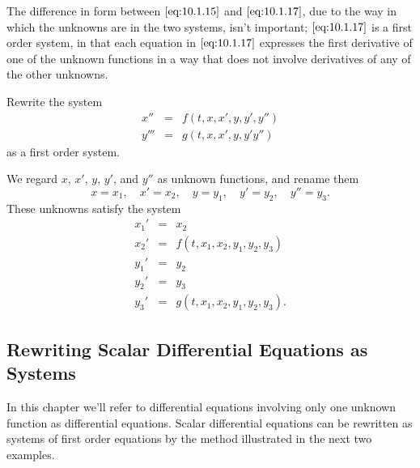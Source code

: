 \documentclass{ximera}
\begin{document}
\begin{remark} The difference in form between $\eqref{eq:10.1.15}$ and
$\eqref{eq:10.1.17}$, due to the way in which the unknowns are 
in the two systems, isn't  important;     $\eqref{eq:10.1.17}$ is a first
order system, in that each equation in $\eqref{eq:10.1.17}$ expresses the
first derivative of one of the unknown functions in a way that does
not involve derivatives of any of the other unknowns.
\end{remark}

\begin{example}\label{example:10.1.5}
 Rewrite the system
$$
\begin{array}{ccc} x''&=&f(t,x,x',y,y',y'')\\
y'''&=&g(t,x,x',y,y'y'')
\end{array}
$$
 as a first order system.


\begin{explanation}
We regard $x$, $x'$, $y$, $y'$, and $y''$ as unknown functions, and
rename them
$$
x=x_1,\quad x'=x_2,\quad y=y_1,\quad y'=y_2,\quad y''=y_3.
$$
These unknowns satisfy the system
$$
\begin{array}{ccl} 
x_1'&=&x_2\\
x_2'&=&f(t,x_1,x_2,y_1,y_2,y_3)\\
y_1'&=&y_2\\
y_2'&=&y_3\\
y_3'&=&g(t,x_1,x_2,y_1,y_2,y_3).\end{array}
$$
\end{explanation}
\end{example}

\subsection*{Rewriting Scalar Differential Equations as Systems}

In this chapter we'll refer to differential equations involving only
one unknown function as  differential equations. Scalar
differential equations can be rewritten as systems of first order
equations by the method illustrated in the next two examples.
\end{document}
